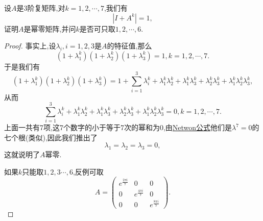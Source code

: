 \documentclass[../../main.tex]{subfiles}%
\begin{document}
\begin{example}\label{example:例题028}
设\( A \)是3阶复矩阵,对\( k = 1,2,\cdots,7 \),我们有
\[
|I + A^k| = 1,
\]
证明\( A \)是幂零矩阵,并问\( k \)是否可只取\( 1,2,\cdots,6 \).
\end{example}
\begin{proof}
事实上,设\( \lambda_i,i = 1,2,3 \)是\( A \)的特征值,那么
\[
(1 + \lambda_1^k)(1 + \lambda_2^k)(1 + \lambda_3^k) = 1,k = 1,2,\cdots,7.
\]
于是我们有
\[
(1 + \lambda_1^k)(1 + \lambda_2^k)(1 + \lambda_3^k) = 1 + \sum_{i = 1}^3 \lambda_i^k + \lambda_1^k\lambda_2^k + \lambda_1^k\lambda_3^k + \lambda_2^k\lambda_3^k + \lambda_1^k\lambda_2^k\lambda_3^k,
\]
从而
\[
\sum_{i = 1}^3 \lambda_i^k + \lambda_1^k\lambda_2^k + \lambda_1^k\lambda_3^k + \lambda_2^k\lambda_3^k + \lambda_1^k\lambda_2^k\lambda_3^k = 0,k = 1,2,\cdots,7.
\]
上面一共有7项,这7个数字的小于等于7次的幂和为0,由\hyperref[theorem:Netwon公式]{Netwon公式}他们是\( \lambda^7 = 0 \)的七个根(类似),因此我们推出了
\[
\lambda_1 = \lambda_2 = \lambda_3 = 0,
\]
这就说明了\( A \)幂零.

如果\( k \)只能取\( 1,2,3\cdots,6 \),反例可取
\[
A = \begin{pmatrix}
e^{\frac{2\pi \mathrm{i}}{7}} & 0 & 0 \\
0 & e^{\frac{4\pi i}{7}} & 0 \\
0 & 0 & e^{\frac{8\pi i}{7}}
\end{pmatrix}.
\]
\end{proof}
\end{document}
